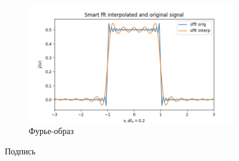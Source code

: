 \documentclass[a4paper, 12pt]{article}
\begin{document}
\begin{figure}[H]
\begin{subfigure}{0.45\textwidth}
            \label{fig:isinc1}
        \end{subfigure}
        \begin{subfigure}{0.45\textwidth}
            \centering
            \includegraphics[width=\linewidth]{1_fsinc.png}
            \caption{Фурье-образ}
            \label{fig:fisinc1}
        \end{subfigure}
        \caption{Подпись}
        \label{fig:sincs1}
    \end{figure}
\end{document}
